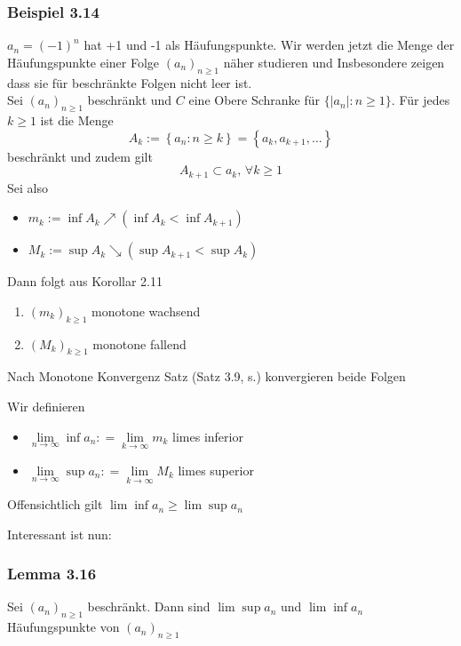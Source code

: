 \subsubsection*{Beispiel 3.14}
$a_n=(-1)^n$ hat +1 und -1 als Häufungspunkte. Wir werden jetzt die Menge der Häufungspunkte einer Folge $\left( a_n\right)_{n\geq 1}$ näher studieren und Insbesondere zeigen dass sie für beschränkte Folgen nicht leer ist. \\

Sei $\left( a_n\right)_{n\geq 1}$ beschränkt und $C$ eine Obere Schranke für $\{ \left| a_n\right| : n\geq 1\}$. Für jedes $k\geq 1$ ist die Menge 
\[A_k:=\left\{ a_n:n\geq k\right\} = \left\{ a_k,a_{k+1},\dots\right\} \] beschränkt und zudem gilt \[A_{k+1}\subset a_k\text{, }\forall k\geq 1\]
Sei also 
\begin{itemize}
\item $m_k:=\inf A_k \nearrow\left( \inf A_k < \inf A_{k+1}\right)$
\item $M_k:=\sup A_k\searrow\left( \sup A_{k+1} < \sup A_k\right)$
\end{itemize} 
Dann folgt aus Korollar 2.11
\begin{enumerate}[\hspace{2mm}i)]
\item $\left( m_k\right)_{k\geq 1}$ monotone wachsend
\item $\left( M_k\right)_{k\geq 1}$ monotone fallend
\end{enumerate}
Nach Monotone Konvergenz Satz (Satz 3.9, s.) konvergieren beide Folgen

\begin{definition}{3.15}
Wir definieren
\begin{itemize}
\item $\mathop {\lim }\limits_{n \to \infty } \inf {a_n}: = \mathop {\lim }\limits_{k \to \infty } {m_k}$ limes inferior
\item $\mathop {\lim }\limits_{n \to \infty } \sup {a_n}: = \mathop {\lim }\limits_{k \to \infty } {M_k}$ limes superior
\end{itemize}
Offensichtlich gilt $\lim\inf a_n\geq \lim\sup a_n$
\end{definition}
\noindent Interessant ist nun:
\subsubsection*{Lemma 3.16}
Sei $\left( a_n\right)_{n\geq 1}$ beschränkt. Dann sind $\lim\sup a_n$ und $\lim\inf a_n$ Häufungspunkte von $\left( a_n\right)_{n\geq 1}$

